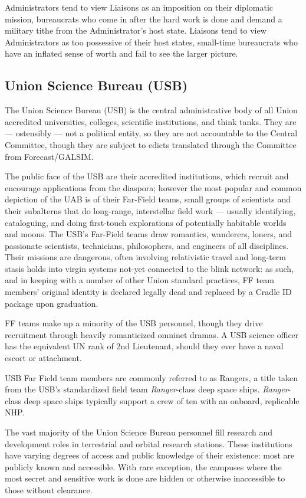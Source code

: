 Administrators tend to view Liaisons as an imposition on their diplomatic mission, bureaucrats
who come in after the hard work is done and demand a military tithe from the Administrator’s
host state. Liaisons tend to view Administrators as too possessive of their host states, small-time
bureaucrats who have an inflated sense of worth and fail to see the larger picture.

\subsection{Union Science Bureau (USB)}

The Union Science Bureau (USB) is the central administrative body of all Union accredited
universities, colleges, scientific institutions, and think tanks. They are — ostensibly — not a
political entity, so they are not accountable to the Central Committee, though they are subject to
edicts translated through the Committee from Forecast/GALSIM.

The public face of the USB are their accredited institutions, which recruit and encourage
applications from the diaspora; however the most popular and common depiction of the UAB is
of their Far-Field teams, small groups of scientists and their subalterns that do long-range,
interstellar field work — usually identifying, cataloguing, and doing first-touch explorations of
potentially habitable worlds and moons. The USB’s Far-Field teams draw romantics, wanderers,
loners, and passionate scientists, technicians, philosophers, and engineers of all disciplines.
Their missions are dangerous, often involving relativistic travel and long-term stasis holds into
virgin systems not-yet connected to the blink network: as such, and in keeping with a number of
other Union standard practices, FF team members’ original identity is declared legally dead and
replaced by a Cradle ID package upon graduation.

FF teams make up a minority of the USB personnel, though they drive recruitment through
heavily romanticized omninet dramas. A USB science officer has the equivalent UN rank of 2nd
Lieutenant, should they ever have a naval escort or attachment.

USB Far Field team members are commonly referred to as Rangers, a title taken from the USB’s
standardized field team \textit{Ranger}-class deep space ships. \textit{Ranger}-class deep space ships typically
support a crew of ten with an onboard, replicable NHP.

The vast majority of the Union Science Bureau personnel fill research and development roles in
terrestrial and orbital research stations. These institutions have varying degrees of access and
public knowledge of their existence: most are publicly known and accessible. With rare
exception, the campuses where the most secret and sensitive work is done are hidden or
otherwise inaccessible to those without clearance.

